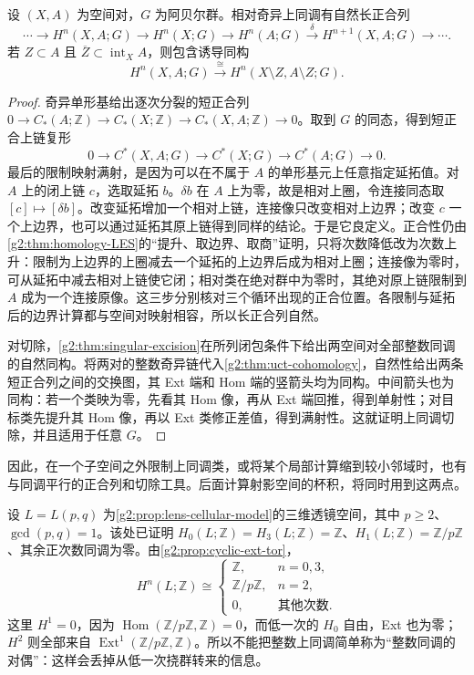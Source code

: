 \begin{proposition}\label{g2:prop:relative-cohomology-exactness}
	设 \((X,A)\) 为空间对，\(G\) 为阿贝尔群。相对奇异上同调有自然长正合列
	\[
		\cdots\longrightarrow H^n(X,A;G)\longrightarrow H^n(X;G)\longrightarrow H^n(A;G)\xrightarrow{\delta}H^{n+1}(X,A;G)\longrightarrow\cdots.
	\]
	若 \(Z\subset A\) 且 \(\overline Z\subset\operatorname{int}_X A\)，则包含诱导同构
	\[
		H^n(X,A;G)\xrightarrow{\ \cong\ }H^n(X\setminus Z,A\setminus Z;G).
	\]
\end{proposition}
\begin{proof}
	奇异单形基给出逐次分裂的短正合列 \(0\to C_*(A;\mathbb Z)\to C_*(X;\mathbb Z)\to C_*(X,A;\mathbb Z)\to0\)。取到 \(G\) 的同态，得到短正合上链复形
	\[
		0\longrightarrow C^*(X,A;G)\longrightarrow C^*(X;G)\longrightarrow C^*(A;G)\longrightarrow0.
	\]
	最后的限制映射满射，是因为可以在不属于 \(A\) 的单形基元上任意指定延拓值。对 \(A\) 上的闭上链 \(c\)，选取延拓 \(b\)。\(\delta b\) 在 \(A\) 上为零，故是相对上圈，令连接同态取 \([c]\mapsto[\delta b]\)。改变延拓增加一个相对上链，连接像只改变相对上边界；改变 \(c\) 一个上边界，也可以通过延拓其原上链得到同样的结论。于是它良定义。正合性仍由\cref{g2:thm:homology-LES}的“提升、取边界、取商”证明，只将次数降低改为次数上升：限制为上边界的上圈减去一个延拓的上边界后成为相对上圈；连接像为零时，可从延拓中减去相对上链使它闭；相对类在绝对群中为零时，其绝对原上链限制到 \(A\) 成为一个连接原像。这三步分别核对三个循环出现的正合位置。各限制与延拓后的边界计算都与空间对映射相容，所以长正合列自然。

	对切除，\cref{g2:thm:singular-excision}在所列闭包条件下给出两空间对全部整数同调的自然同构。将两对的整数奇异链代入\cref{g2:thm:uct-cohomology}，自然性给出两条短正合列之间的交换图，其 Ext 端和 Hom 端的竖箭头均为同构。中间箭头也为同构：若一个类映为零，先看其 Hom 像，再从 Ext 端回推，得到单射性；对目标类先提升其 Hom 像，再以 Ext 类修正差值，得到满射性。这就证明上同调切除，并且适用于任意 \(G\)。
\end{proof}

因此，在一个子空间之外限制上同调类，或将某个局部计算缩到较小邻域时，也有与同调平行的正合列和切除工具。后面计算射影空间的杯积，将同时用到这两点。

\begin{example}\label{g2:exm:uct-lens-cohomology}
	设 \(L=L(p,q)\) 为\cref{g2:prop:lens-cellular-model}的三维透镜空间，其中 \(p\ge2\)、\(\gcd(p,q)=1\)。该处已证明 \(H_0(L;\mathbb Z)=H_3(L;\mathbb Z)=\mathbb Z\)、\(H_1(L;\mathbb Z)=\mathbb Z/p\mathbb Z\)、其余正次数同调为零。由\cref{g2:prop:cyclic-ext-tor}，
	\[
		H^n(L;\mathbb Z)\cong
		\begin{cases}
			\mathbb Z,&n=0,3,\\
			\mathbb Z/p\mathbb Z,&n=2,\\
			0,&\text{其他次数}.
		\end{cases}
	\]
	这里 \(H^1=0\)，因为 \(\operatorname{Hom}(\mathbb Z/p\mathbb Z,\mathbb Z)=0\)，而低一次的 \(H_0\) 自由，Ext 也为零；\(H^2\) 则全部来自 \(\operatorname{Ext}^1(\mathbb Z/p\mathbb Z,\mathbb Z)\)。所以不能把整数上同调简单称为“整数同调的对偶”：这样会丢掉从低一次挠群转来的信息。
\end{example}

